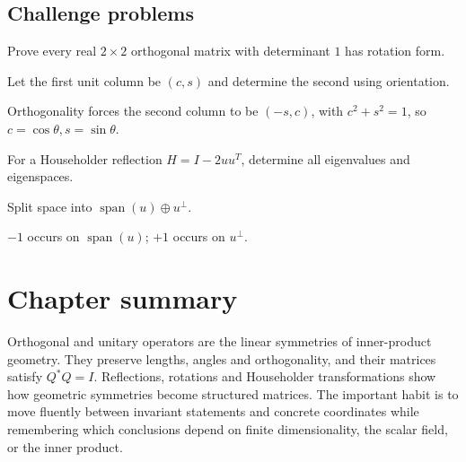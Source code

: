 \subsection*{Challenge problems}

\begin{exercise}\label{exr:i15-expand-15}
Prove every real \(2\times2\) orthogonal matrix with determinant \(1\) has rotation form.
\end{exercise}
\begin{hint}
Let the first unit column be \((c,s)\) and determine the second using orientation.
\end{hint}
\begin{solution}
Orthogonality forces the second column to be \((-s,c)\), with \(c^2+s^2=1\), so \(c=\cos\theta,s=\sin\theta\).
\end{solution}

\begin{exercise}\label{exr:i15-expand-16}
For a Householder reflection \(H=I-2uu^T\), determine all eigenvalues and eigenspaces.
\end{exercise}
\begin{hint}
Split space into \(\operatorname{span}(u)\oplus u^\perp\).
\end{hint}
\begin{solution}
\(-1\) occurs on \(\operatorname{span}(u)\); \(+1\) occurs on \(u^\perp\).
\end{solution}
\section*{Chapter summary}
Orthogonal and unitary operators are the linear symmetries of inner-product geometry. They preserve lengths, angles and orthogonality, and their matrices satisfy $Q^*Q=I$. Reflections, rotations and Householder transformations show how geometric symmetries become structured matrices.
The important habit is to move fluently between invariant statements and concrete coordinates while remembering which conclusions depend on finite dimensionality, the scalar field, or the inner product.
